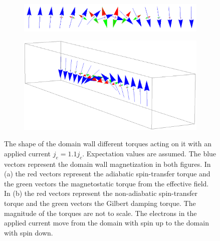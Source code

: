 \documentclass[12pt, a4paper]{article}		%
\numberwithin{equation}{section}
\begin{document}
\begin{figure}[h!]
\centering
\begin{subfigure}{\textwidth}
  \centering
  \includegraphics[width=1.0\linewidth]{Figures/NeelJeGTJcAdSTTMS.png}
  \caption{}
  \label{fig:Neel_AdSTT_Heff_JeGTJc}
\end{subfigure}
\begin{subfigure}{\textwidth}
  \centering
  \includegraphics[width=1.0\linewidth]{Figures/NeelJeGTJcNonAdSTTGD.png}
  \caption{}
  \label{fig:Neel_NonAdSTT_GD_JeGTJc}
\end{subfigure}
\caption{The shape of the domain wall different torques acting on it with an applied current $j_e=1.1j_c$. Expectation values are assumed. The blue vectors represent the domain wall magnetization in both figures. In (a) the red vectors represent the adiabatic spin-transfer torque and the green vectors the magnetostatic torque from the effective field. In (b) the red vectors represent the non-adiabatic spin-transfer torque and the green vectors the Gilbert damping torque. The magnitude of the torques are not to scale. The electrons in the applied current move from the domain with spin up to the domain with spin down.}
\label{fig:DW_JeGTJc}
\end{figure}
\end{document}
